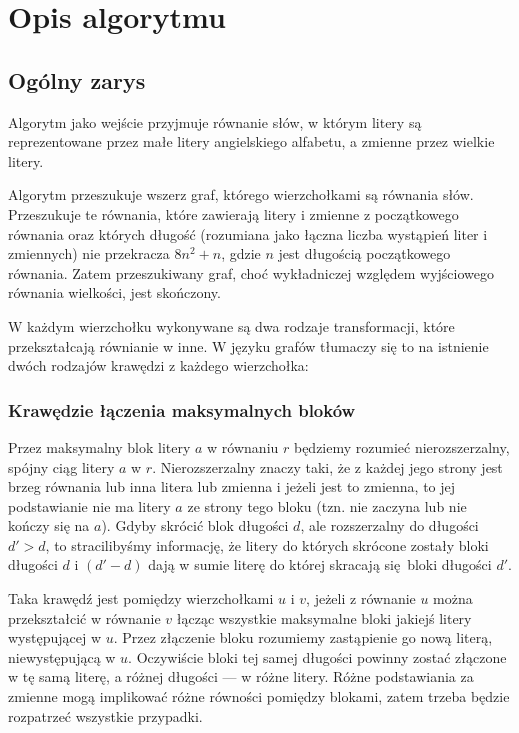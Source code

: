 \documentclass[leqno, 12pt]{article}
\begin{document}
\newpage
\section{Opis algorytmu}

\subsection{Ogólny zarys}
Algorytm jako wejście przyjmuje równanie słów, w którym litery są reprezentowane przez małe litery angielskiego alfabetu, a zmienne przez wielkie litery.


Algorytm przeszukuje wszerz graf, którego wierzchołkami są równania słów. 
Przeszukuje te równania, które zawierają litery i zmienne z początkowego równania oraz których długość (rozumiana jako łączna liczba wystąpień liter i zmiennych) nie przekracza $8n^2 + n$, gdzie $n$ jest długością początkowego równania. Zatem przeszukiwany graf, choć wykładniczej względem wyjściowego równania wielkości, jest skończony.

W każdym wierzchołku wykonywane są dwa rodzaje transformacji, które przekształcają równianie w inne. W języku grafów tłumaczy się to na istnienie dwóch rodzajów krawędzi z każdego wierzchołka:

\subsubsection*{Krawędzie łączenia maksymalnych bloków}
Przez maksymalny blok litery $a$ w równaniu $r$ będziemy rozumieć nierozszerzalny, spójny ciąg litery $a$ w $r$. Nierozszerzalny znaczy taki, że z każdej jego strony jest brzeg równania lub inna litera lub zmienna i jeżeli jest to zmienna, to jej podstawianie nie ma litery $a$ ze strony tego bloku (tzn. nie zaczyna lub nie kończy się na $a$). Gdyby skrócić blok długości $d$, ale rozszerzalny do długości $d' > d$, to stracilibyśmy informację, że litery do których skrócone zostały bloki długości $d$ i $(d' - d)$ dają w sumie literę do której skracają się bloki długości $d'$.

Taka krawędź jest pomiędzy wierzchołkami $u$ i $v$, jeżeli z równanie $u$ można przekształcić w równanie $v$ łącząc wszystkie maksymalne bloki jakiejś litery występującej w $u$. Przez złączenie bloku rozumiemy zastąpienie go nową literą, niewystępującą w $u$. Oczywiście bloki tej samej długości powinny zostać złączone w tę samą literę, a różnej długości --- w różne litery.
Różne podstawiania za zmienne mogą implikować różne równości pomiędzy blokami, zatem trzeba będzie rozpatrzeć wszystkie przypadki.
\end{document}
